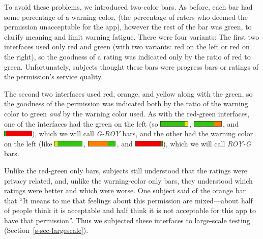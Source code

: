 \documentclass[11pt]{article}
\newcommand{\refsec}[1]{Section~\ref{#1}}
\begin{document}
To avoid these problems, we
introduced two-color bars. As before, each bar had some percentage of 
a warning color, (the percentage of raters who deemed the permission
unacceptable for the app), however the rest of the
bar was green, to clarify meaning and limit warning fatigue.
There were four variants:
\label{ss-sec-pbars-r4}
The first two interfaces used only red 
and green (with two variants: red on the left or red on the right),
so the goodness of a rating was indicated only by the ratio of red to green.
Unfortunately, subjects thought these bars were
progress bars or ratings of the 
permission's service quality.

The second two interfaces used red, orange, and yellow 
along with the green, so the goodness of the permission
was indicated both by the ratio of the warning color to green \emph{and} by the warning color
used. As with the red-green interfaces, one of the interfaces had the green on the left (so 
\includegraphics[height=8pt]{img/Bars4/RedYellowGreen/GreenYellowBar.png}\,,
\includegraphics[height=8pt]{img/Bars4/RedYellowGreen/GreenOrangeBar.png}\,, and 
\includegraphics[height=8pt]{img/Bars4/RedYellowGreen/GreenRedBar.png}),
which we will call \emph{G-ROY} bars, and the
other had the warning color on the left (like 
\includegraphics[height=8pt]{img/Bars4/RedYellowGreen/YellowGreenBar.png}\,,
\includegraphics[height=8pt]{img/Bars4/RedYellowGreen/OrangeGreenBar.png}\,, and
\includegraphics[height=8pt]{img/Bars4/RedYellowGreen/RedGreenBar.png}),
which we will call \emph{ROY-G} bars.


Unlike the red-green only
bars, subjects still understood that the ratings were privacy related, and, 
unlike the warning-color only bars, 
they understood which ratings were better and which were worse. One subject
said of the orange bar that ``It means to me that feelings about 
this permission are mixed---about half of people think 
it is acceptable and half think it is not 
acceptable for this app to have that permission''. Thus we 
subjected these interfaces to large-scale testing (\refsec{s-sec-largescale}). 
\end{document}
